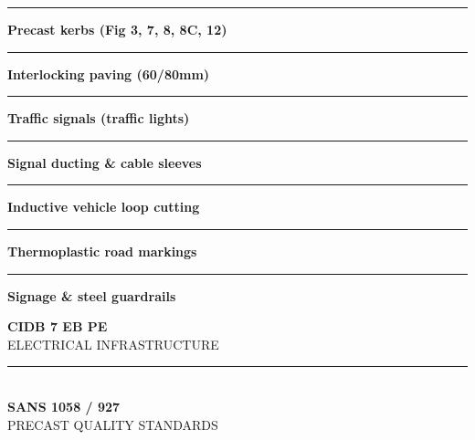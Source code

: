 \documentclass[a4paper,11pt]{article}
\providecommand{\faTrafficLight}{\faBolt}
\begin{document}
\begin{minipage}[t]{0.34\textwidth}
    \vspace{0pt}
    \begin{tcolorbox}[
        enhanced, colback=mhoffwhite, colframe=mhnavy, boxrule=1pt, arc=4pt,
        title={\bfseries\color{white}\faTrafficLight\ Finishing Scope of Work},
        colbacktitle=mhnavy, left=7pt, right=7pt, top=6pt, bottom=6pt,
        drop shadow=black!6
    ]
        \fontsize{8.1pt}{11.6pt}\selectfont
        \textcolor{mhnavy}{\rule{4pt}{4pt}}\hspace{4pt}\textbf{Precast kerbs (Fig 3, 7, 8, 8C, 12)}\\
        \textcolor{mhnavy}{\rule{4pt}{4pt}}\hspace{4pt}\textbf{Interlocking paving (60/80mm)}\\
        \textcolor{mhnavy}{\rule{4pt}{4pt}}\hspace{4pt}\textbf{Traffic signals (traffic lights)}\\
        \textcolor{mhnavy}{\rule{4pt}{4pt}}\hspace{4pt}\textbf{Signal ducting \& cable sleeves}\\
        \textcolor{mhnavy}{\rule{4pt}{4pt}}\hspace{4pt}\textbf{Inductive vehicle loop cutting}\\
        \textcolor{mhnavy}{\rule{4pt}{4pt}}\hspace{4pt}\textbf{Thermoplastic road markings}\\
        \textcolor{mhnavy}{\rule{4pt}{4pt}}\hspace{4pt}\textbf{Signage \& steel guardrails}
    \end{tcolorbox}

    \vspace{0.20cm}

    \begin{tcolorbox}[
        enhanced, colback=white, colframe=mhlightgray, boxrule=0.8pt, arc=4pt,
        left=6pt, right=6pt, top=6pt, bottom=6pt, halign=center,
        drop shadow=black!4
    ]
        {\fontsize{18pt}{20pt}\selectfont\bfseries\color{mhblue}CIDB 7 EB PE}\\[1pt]
        {\fontsize{7.4pt}{9pt}\selectfont\color{mhtextmuted}\MakeUppercase{Electrical Infrastructure}}\\[4pt]
        \textcolor{mhlightgray}{\rule{3.2cm}{0.6pt}}\\[4pt]
        {\fontsize{13pt}{15pt}\selectfont\bfseries\color{mhnavy}SANS 1058 / 927}\\[1pt]
        {\fontsize{7.2pt}{9pt}\selectfont\color{mhtextmuted}\MakeUppercase{Precast Quality Standards}}
    \end{tcolorbox}
\end{minipage}
\end{document}
